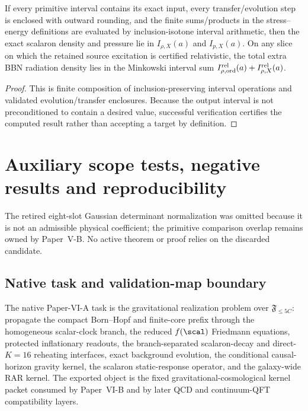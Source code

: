 \documentclass[12pt,a4paper]{article}
\begin{document}
\begin{lemma}
\label{p9:lem:scalaron-certificate-acceptance}
If every primitive interval contains its exact input, every transfer/evolution
step is enclosed with outward rounding, and the finite sums/products in the
stress--energy definitions are evaluated by inclusion-isotone interval
arithmetic, then the exact scalaron density and pressure lie in
\(I_{\rho,X}(a)\) and \(I_{p,X}(a)\).  On any slice on which the retained
source excitation is certified relativistic, the total extra BBN radiation
density lies in the Minkowski interval sum
\(I_{\rho,\rm ord}^{\rm rel}(a)+I_{\rho,X}^{\rm rel}(a)\).
\end{lemma}

\begin{proof}
This is finite composition of inclusion-preserving interval operations and
validated evolution/transfer enclosures.  Because the output interval is not
preconditioned to contain a desired value, successful verification certifies
the computed result rather than accepting a target by definition.
\end{proof}



\section{Auxiliary scope tests, negative results and reproducibility}
\label{p6c:sec:c7}
\noindent The retired eight-slot Gaussian determinant normalization was omitted because it is not an admissible physical coefficient; the primitive comparison overlap remains owned by Paper~V-B. No active theorem or proof relies on the discarded candidate.\par
\subsection{Native task and validation-map boundary}
\label{p8:subsec:native-task-validation-boundary}

The native Paper-VI-A task is the gravitational realization problem over \(\mathfrak F_{\le5C}\): propagate the compact Born--Hopf and finite-core prefix through the homogeneous scalar-clock branch, the reduced \(f(\scal)\) Friedmann equations, protected inflationary readouts, the branch-separated scalaron-decay and direct-\(K=16\) reheating interfaces, exact background evolution, the conditional causal-horizon gravity kernel, the scalaron static-response operator, and the galaxy-wide RAR kernel.  The exported object is the fixed gravitational-cosmological kernel packet consumed by Paper~VI-B and by later QCD and continuum-QFT compatibility layers.
\end{document}
